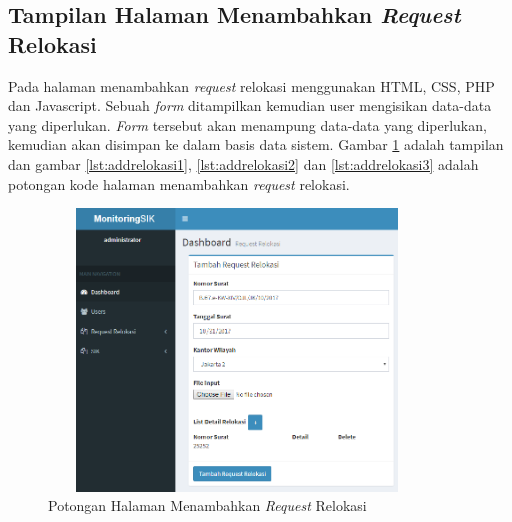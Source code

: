 

\subsection{Tampilan Halaman Menambahkan \textit{Request} Relokasi}
Pada halaman menambahkan \textit{request} relokasi menggunakan HTML, CSS, PHP dan Javascript. Sebuah \textit{form} ditampilkan kemudian user mengisikan data-data yang diperlukan. \textit{Form} tersebut akan menampung data-data yang diperlukan, kemudian akan disimpan ke dalam basis data sistem. Gambar \ref{figure:tambahReqRelokasi} adalah tampilan dan gambar \ref{lst:addrelokasi1}, \ref{lst:addrelokasi2} dan \ref{lst:addrelokasi3} adalah potongan kode halaman menambahkan \textit{request} relokasi.
\begin{figure}[h!]
\centerline
{\includegraphics[width=10cm,height=7.5cm]{bab5/addReqRelokasi.png}}
\caption{Potongan Halaman Menambahkan \textit{Request} Relokasi}
\label{figure:tambahReqRelokasi}
\end{figure}





